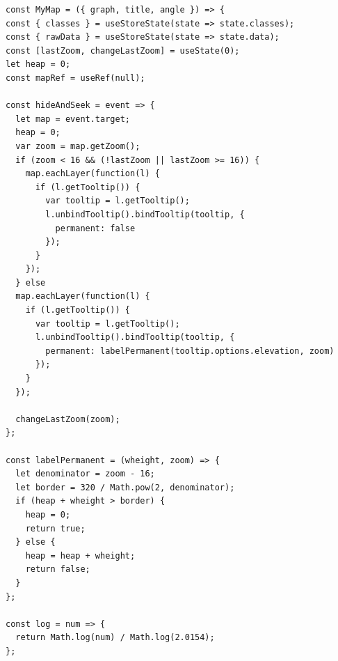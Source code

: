 \begin{lstlisting}
const MyMap = ({ graph, title, angle }) => {
const { classes } = useStoreState(state => state.classes);
const { rawData } = useStoreState(state => state.data);
const [lastZoom, changeLastZoom] = useState(0);
let heap = 0;
const mapRef = useRef(null);

const hideAndSeek = event => {
  let map = event.target;
  heap = 0;
  var zoom = map.getZoom();
  if (zoom < 16 && (!lastZoom || lastZoom >= 16)) {
    map.eachLayer(function(l) {
      if (l.getTooltip()) {
        var tooltip = l.getTooltip();
        l.unbindTooltip().bindTooltip(tooltip, {
          permanent: false
        });
      }
    });
  } else
  map.eachLayer(function(l) {
    if (l.getTooltip()) {
      var tooltip = l.getTooltip();
      l.unbindTooltip().bindTooltip(tooltip, {
        permanent: labelPermanent(tooltip.options.elevation, zoom)
      });
    }
  });

  changeLastZoom(zoom);
};

const labelPermanent = (wheight, zoom) => {
  let denominator = zoom - 16;
  let border = 320 / Math.pow(2, denominator);
  if (heap + wheight > border) {
    heap = 0;
    return true;
  } else {
    heap = heap + wheight;
    return false;
  }
};

const log = num => {
  return Math.log(num) / Math.log(2.0154);
};


\end{lstlisting}
